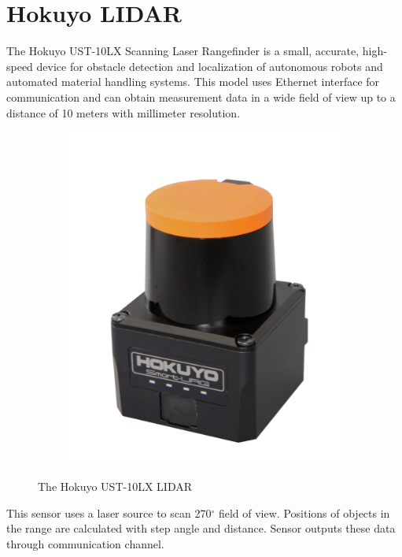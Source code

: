 \documentclass[times, utf8, diplomski, english]{fer}
\begin{document}
\section{Hokuyo LIDAR}
The Hokuyo UST-10LX Scanning Laser Rangefinder is a small, accurate, high-speed device for obstacle detection and localization of autonomous robots and automated material handling systems. 
This model uses Ethernet interface for communication and can obtain measurement data in a wide field of view up to a distance of 10 meters with millimeter resolution.
\begin{figure}[h!]
    \centering
        \begin{subfigure}[t]{0.2\textwidth}
        \includegraphics[width=\textwidth]{hokuyo_pic}
    \end{subfigure}
    \caption{The Hokuyo UST-10LX LIDAR}\label{fig:ur10}
\end{figure}
This sensor uses a laser source to scan 270$^\circ$ field of view. Positions of objects in the range are calculated with step angle and distance. Sensor outputs these data through communication channel.
\end{document}
